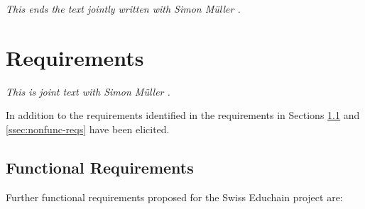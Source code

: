 \emph{This ends the text jointly written with Simon M{\"u}ller \cite{mueller20}.}


\section{Requirements} \label{ssec:architectural-requirements}

\emph{This is joint text with Simon M{\"u}ller \cite{mueller20}.}

In addition to the requirements identified in \cite{Gres18} the requirements in Sections \ref{ssec:func-req} and \ref{ssec:nonfunc-reqs} have been elicited.

\subsection{Functional Requirements} \label{ssec:func-req}


\begin{table}[h!]
	\centering
	\caption{Initial Educhain Requirements based on \cite{educhain-architecture}}
	\label{tab:educhain-requirements-jerinas}
\end{table}

Further functional requirements proposed for the Swiss Educhain project are:


